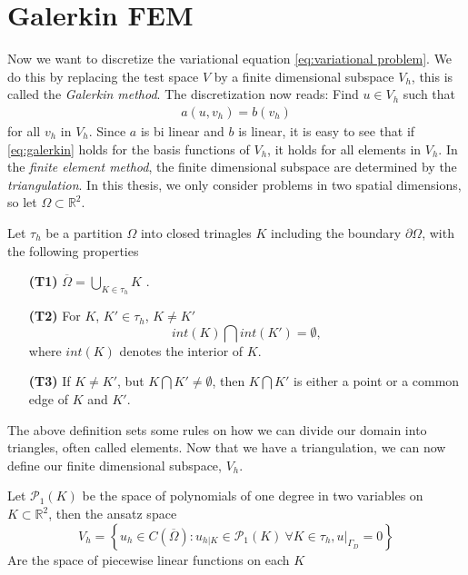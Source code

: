 \documentclass[../Main/main.tex]{subfiles}
\begin{document}
	\section*{Galerkin FEM} \label{galerkin_fem}
	Now we want to discretize the variational equation \eqref{eq:variational problem}. We do this by replacing the test space $V$ by a finite dimensional subspace $V_h$, this is called the \emph{Galerkin method}. The discretization now reads: Find $u \in V_h$ such that 
	\begin{equation}\label{eq:galerkin}
		\begin{gathered}
			a(u,v_h) = b(v_h) 
		\end{gathered}
	\end{equation}
	for all $v_h$ in $V_h$.
	Since $a$ is bi linear and $b$ is linear, it is easy to see that if \eqref{eq:galerkin} holds for the basis functions of $V_h$, it holds for all elements in $V_h$. In the \emph{finite element method}, the finite dimensional subspace are determined by the \emph{triangulation}. In this thesis, we only consider problems in two spatial dimensions, so let $\Omega \subset \mathbb{R}^2$. 
	\begin{definition}
		Let $\tau_h$ be a partition $\Omega$ into closed trinagles $K$ including the boundary $\partial \Omega$, with the following properties
		\begin{itemize}
			\item[\textbf{(T1)}] $\overline{\Omega} = \bigcup_{K\in \tau_h}K$ .
			\item[\textbf{(T2)}] For $K$, $K' \in \tau_h$, $K \neq K'$ \begin{equation*}
				int(K) \bigcap int(K')=\emptyset,
			\end{equation*} 
			where $int(K)$ denotes the interior of $K$.
			\item[\textbf{(T3)}] If $K\neq K'$, but $K\bigcap K' \neq \emptyset$, then $K\bigcap K'$ is either a point or a common edge of $K$ and $K'$.
			
		\end{itemize}
	\end{definition}
	The above definition sets some rules on how we can divide our domain into triangles, often called elements.
	Now that we have a triangulation, we can now define our finite dimensional subspace, $V_h$.
	\begin{definition}\label{def:linear ansatz}
		Let $\mathcal{P}_1(K)$ be the space of polynomials of one degree in two variables on $K\subset \mathbb{R}^2$, then the ansatz space
		\begin{equation*}
			V_h = \left \{ u_h \in C(\overline{\Omega}) : u_{h|K} \in \mathcal{P}_1(K) \ \forall K \in \tau_h, u|_{\Gamma_D} = 0  \right \}
		\end{equation*}
		Are the space of piecewise linear functions on each $K$
	\end{definition}
\end{document}
